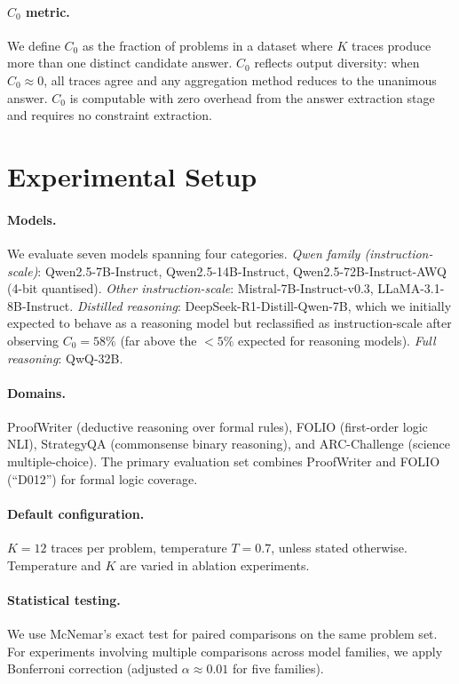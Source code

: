 \documentclass[11pt]{article}
\begin{document}
\paragraph{$C_0$ metric.}
We define $C_0$ as the fraction of problems in a dataset where $K$ traces produce more than one distinct candidate answer.
$C_0$ reflects output diversity: when $C_0 \approx 0$, all traces agree and any aggregation method reduces to the unanimous answer.
$C_0$ is computable with zero overhead from the answer extraction stage and requires no constraint extraction.

\section{Experimental Setup}
\label{sec:setup}

\paragraph{Models.}
We evaluate seven models spanning four categories.
\emph{Qwen family (instruction-scale)}: Qwen2.5-7B-Instruct, Qwen2.5-14B-Instruct, Qwen2.5-72B-Instruct-AWQ (4-bit quantised).
\emph{Other instruction-scale}: Mistral-7B-Instruct-v0.3, LLaMA-3.1-8B-Instruct.
\emph{Distilled reasoning}: DeepSeek-R1-Distill-Qwen-7B, which we initially expected to behave as a reasoning model but reclassified as instruction-scale after observing $C_0{=}58\%$ (far above the $<5\%$ expected for reasoning models).
\emph{Full reasoning}: QwQ-32B.

\paragraph{Domains.}
ProofWriter (deductive reasoning over formal rules), FOLIO (first-order logic NLI), StrategyQA (commonsense binary reasoning), and ARC-Challenge (science multiple-choice).
The primary evaluation set combines ProofWriter and FOLIO (``D012'') for formal logic coverage.

\paragraph{Default configuration.}
$K{=}12$ traces per problem, temperature $T{=}0.7$, unless stated otherwise.
Temperature and $K$ are varied in ablation experiments.

\paragraph{Statistical testing.}
We use McNemar's exact test for paired comparisons on the same problem set.
For experiments involving multiple comparisons across model families, we apply Bonferroni correction (adjusted $\alpha \approx 0.01$ for five families).
\end{document}
